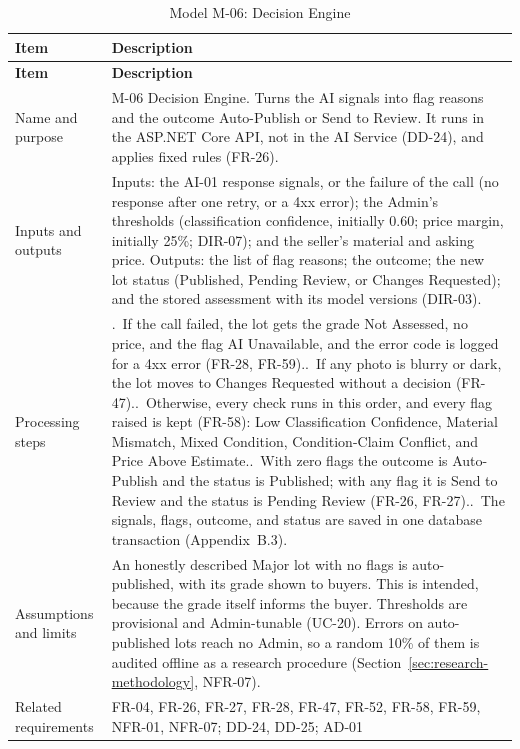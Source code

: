 {\footnotesize
\begin{longtable}{@{}>{\raggedright\arraybackslash}p{}>{\raggedright\arraybackslash}p{}@{}}
\caption{Model M-06: Decision Engine}\label{tab:m-06}\\
\toprule
\textbf{Item} & \textbf{Description} \\
\midrule
\endfirsthead
\toprule
\textbf{Item} & \textbf{Description} \\
\midrule
\endhead
Name and purpose & M-06 Decision Engine. Turns the AI signals into flag reasons and the outcome Auto-Publish or Send to Review. It runs in the ASP.NET Core API, not in the AI Service (DD-24), and applies fixed rules (FR-26). \\
Inputs and outputs & Inputs: the AI-01 response signals, or the failure of the call (no response after one retry, or a 4xx error); the Admin's thresholds (classification confidence, initially 0.60; price margin, initially 25\%; DIR-07); and the seller's material and asking price. Outputs: the list of flag reasons; the outcome; the new lot status (Published, Pending Review, or Changes Requested); and the stored assessment with its model versions (DIR-03). \\
Processing steps & 1.~If the call failed, the lot gets the grade Not Assessed, no price, and the flag AI Unavailable, and the error code is logged for a 4xx error (FR-28, FR-59).\newline
2.~If any photo is blurry or dark, the lot moves to Changes Requested without a decision (FR-47).\newline
3.~Otherwise, every check runs in this order, and every flag raised is kept (FR-58): Low Classification Confidence, Material Mismatch, Mixed Condition, Condition-Claim Conflict, and Price Above Estimate.\newline
4.~With zero flags the outcome is Auto-Publish and the status is Published; with any flag it is Send to Review and the status is Pending Review (FR-26, FR-27).\newline
5.~The signals, flags, outcome, and status are saved in one database transaction (Appendix~B.3). \\
Assumptions and limits & An honestly described Major lot with no flags is auto-published, with its grade shown to buyers. This is intended, because the grade itself informs the buyer. Thresholds are provisional and Admin-tunable (UC-20). Errors on auto-published lots reach no Admin, so a random 10\% of them is audited offline as a research procedure (Section~\ref{sec:research-methodology}, NFR-07). \\
Related requirements & FR-04, FR-26, FR-27, FR-28, FR-47, FR-52, FR-58, FR-59, NFR-01, NFR-07; DD-24, DD-25; AD-01 \\
\bottomrule
\end{longtable}
}

